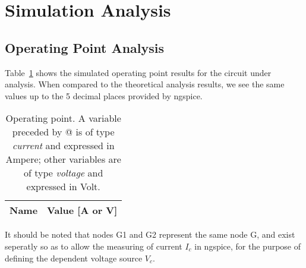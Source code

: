 \section{Simulation Analysis}
\label{sec:simulation}

\subsection{Operating Point Analysis}

Table~\ref{tab:op} shows the simulated operating point results for the circuit
under analysis. When compared to the theoretical analysis results, we see the same values
up to the 5 decimal places provided by ngspice.

\begin{table}[H]
  \centering
  \begin{tabular}{|l|r|}
    \hline    
    {\bf Name} & {\bf Value [A or V]} \\ \hline
    
  \end{tabular}
  \caption{Operating point. A variable preceded by @ is of type {\em current}
    and expressed in Ampere; other variables are of type {\it voltage} and expressed in
    Volt.}
  \label{tab:op}
\end{table}

It should be noted that nodes G1 and G2 represent the same node G, and exist seperatly
so as to allow the measuring of current $I_c$ in ngspice, for the purpose of defining the
dependent voltage source $V_c$.

